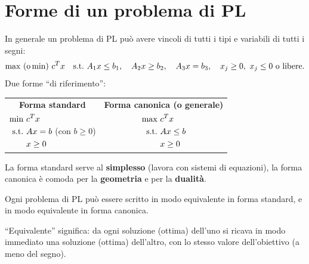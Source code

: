\section{Forme di un problema di PL}

In generale un problema di PL può avere vincoli di tutti i tipi e variabili di tutti i segni:
\[
\max\ (\text{o}\min)\ c^Tx\quad\st\ A_1x\le b_1,\quad A_2x\ge b_2,\quad A_3x=b_3,\quad x_j\ge0,\ x_j\le0\ \text{o libere}.
\]
Due forme ``di riferimento'':
\begin{center}
\begin{tabular}{@{}c@{\qquad\qquad}c@{}}
\textbf{Forma standard} & \textbf{Forma canonica (o generale)}\\[3pt]
$\begin{aligned}\min\ &c^Tx\\ \text{s.t.}\ &Ax=b\\ &x\ge0\end{aligned}$ \quad (con $b\ge0$)
&
$\begin{aligned}\max\ &c^Tx\\ \text{s.t.}\ &Ax\le b\\ &x\ge0\end{aligned}$
\end{tabular}
\end{center}
La forma standard serve al \textbf{simplesso} (lavora con sistemi di equazioni), la forma canonica è comoda per la \textbf{geometria} e per la \textbf{dualità}.

\begin{prop}
Ogni problema di PL può essere scritto in modo equivalente in forma standard, e in modo equivalente in forma canonica.
\end{prop}
``Equivalente'' significa: da ogni soluzione (ottima) dell'uno si ricava in modo immediato una soluzione (ottima) dell'altro, con lo stesso valore dell'obiettivo (a meno del segno).

